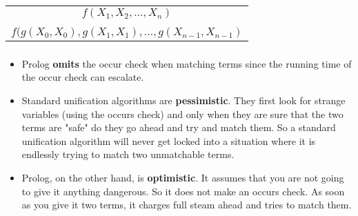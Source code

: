 \begin{frame}
	\frametitle{\insertsection}
	\begin{table}
		\centering
		\begin{tabular}{c}
			\(f(X_1, X_2, \ldots, X_n) \) \\
			\\
			\(f(g(X_0, X_0), g(X_1, X_1), \ldots, g(X_{n-1}, X_{n-1}) \)
		\end{tabular}
	\end{table}
\end{frame}

\begin{frame}
	\frametitle{\insertsection}
	\begin{itemize}
		\item Prolog \textbf{omits} the occur check when matching terms since the running time of the occur check can escalate.
		\item Standard unification algorithms are \textbf{pessimistic}. They first look	for strange variables (using the occurs check) and only when they are sure that the two terms are "safe" do they go ahead and try and match them. So a standard unification algorithm will never get locked into a situation where it is endlessly trying to match two unmatchable terms.
		\item Prolog, on the other hand, is \textbf{optimistic}. It assumes that you are not going to give it anything dangerous. So it does not make an occurs check. As soon as you give it two terms, it charges full steam ahead and tries to match them.
	\end{itemize}
\end{frame}

